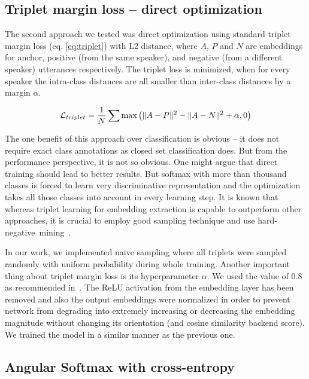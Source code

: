 \subsection*{Triplet margin loss -- direct optimization}

The second approach we tested was direct optimization using standard triplet margin loss (eq. \ref{eq:triplet}) with L2 distance, where $ A $, $ P $ and $ N $ are embeddings for anchor, positive (from the same speaker), and negative (from a different speaker) utterances respectively. The triplet loss is minimized, when for every speaker the intra-class distances are all smaller than inter-class distances by a margin $ \alpha $.

\begin{equation} \label{eq:triplet}
\mathcal{L}_{triplet} = \frac{1}{N} \sum \textnormal{max}
\left( \lVert A - P\rVert^2 - \lVert A - N\rVert^2 + \alpha, 0 \right)
\end{equation}

\noindent
The one benefit of this approach over classification is obvious -- it does not require exact class annotations as closed set classification does. But from the performance perspective, it is not so obvious. One might argue that direct training should lead to better results. But softmax with more than thousand classes is forced to learn very discriminative representation and the optimization takes all those classes into account in every learning step. It is known that whereas triplet learning for embedding extraction is capable to outperform other approaches, it is crucial to employ good sampling technique and use hard-negative~mining~\cite{YuanYZ16}.

\medskip
In our work, we implemented naive sampling where all triplets were sampled randomly with uniform probability during whole training. Another important thing about triplet margin loss is its hyperparameter $ \alpha $. We used the value of 0.8 as recommended in~\cite{x_vectors_triplet}. The ReLU activation from the embedding layer has been removed and also the output embeddings were normalized in order to prevent network from degrading into extremely increasing or decreasing the embedding magnitude without changing its orientation (and cosine similarity backend score). We trained the model in a similar manner as the previous one.

\subsection*{Angular Softmax with cross-entropy}

